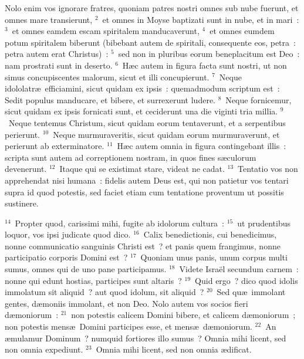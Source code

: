 \lettrine[lines=10,image=true,loversize=0.05,lraise=-0.03]{N}{}olo enim vos ignorare fratres, quoniam patres nostri omnes sub nube fuerunt, et omnes mare transierunt,
${}^{2}$~et omnes in Moyse baptizati sunt in nube, et in mari~:
${}^{3}$~et omnes eamdem escam spiritalem manducaverunt,
${}^{4}$~et omnes eumdem potum spiritalem biberunt (bibebant autem de spiritali, consequente eos, petra~: petra autem erat Christus)~:
${}^{5}$~sed non in pluribus eorum beneplacitum est Deo~: nam prostrati sunt in deserto.
${}^{6}$~H\ae c autem in figura facta sunt nostri, ut non simus concupiscentes malorum, sicut et illi concupierunt.
${}^{7}$~Neque idololatr\ae\ efficiamini, sicut quidam ex ipsis~: quemadmodum scriptum est~: Sedit populus manducare, et bibere, et surrexerunt ludere.
${}^{8}$~Neque fornicemur, sicut quidam ex ipsis fornicati sunt, et ceciderunt una die viginti tria millia.
${}^{9}$~Neque tentemus Christum, sicut quidam eorum tentaverunt, et a serpentibus perierunt.
${}^{10}$~Neque murmuraveritis, sicut quidam eorum murmuraverunt, et perierunt ab exterminatore.
${}^{11}$~H\ae c autem omnia in figura contingebant illis~: scripta sunt autem ad correptionem nostram, in quos fines s\ae culorum devenerunt.
${}^{12}$~Itaque qui se existimat stare, videat ne cadat.
${}^{13}$~Tentatio vos non apprehendat nisi humana~: fidelis autem Deus est, qui non patietur vos tentari supra id quod potestis, sed faciet etiam cum tentatione proventum ut possitis sustinere.


${}^{14}$~Propter quod, carissimi mihi, fugite ab idolorum cultura~:
${}^{15}$~ut prudentibus loquor, vos ipsi judicate quod dico.
${}^{16}$~Calix benedictionis, cui benedicimus, nonne communicatio sanguinis Christi est~? et panis quem frangimus, nonne participatio corporis Domini est~?
${}^{17}$~Quoniam unus panis, unum corpus multi sumus, omnes qui de uno pane participamus.
${}^{18}$~Videte Isra\"el secundum carnem~: nonne qui edunt hostias, participes sunt altaris~?
${}^{19}$~Quid ergo~? dico quod idolis immolatum sit aliquid~? aut quod idolum, sit aliquid~?
${}^{20}$~Sed qu\ae\ immolant gentes, d\ae moniis immolant, et non Deo. Nolo autem vos socios fieri d\ae moniorum~:
${}^{21}$~non potestis calicem Domini bibere, et calicem d\ae moniorum~; non potestis mens\ae\ Domini participes esse, et mens\ae\ d\ae moniorum.
${}^{22}$~An \ae mulamur Dominum~? numquid fortiores illo sumus~? Omnia mihi licent, sed non omnia expediunt.
${}^{23}$~Omnia mihi licent, sed non omnia \ae dificat.


